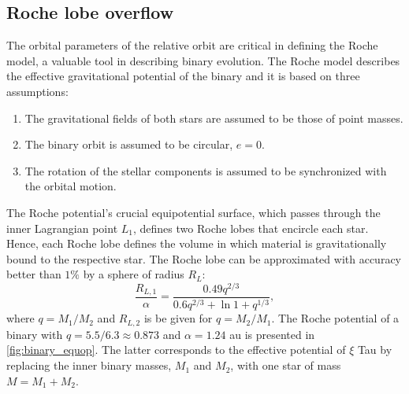 \subsection{Roche lobe overflow}\label{sub:roche_lobe}

The orbital parameters of the relative orbit are critical in defining the Roche model, a valuable tool in describing binary evolution. The Roche model describes the effective gravitational potential of the binary and it is based on three assumptions:
\begin{enumerate}
    \item The gravitational fields of both stars are assumed to be those of point masses.
    \item The binary orbit is assumed to be circular, $e=0$.
    \item The rotation of the stellar components is assumed to be synchronized with the orbital motion. 
\end{enumerate}
The Roche potential's crucial equipotential surface, which passes through the inner Lagrangian point $L_1$, defines two Roche lobes that encircle each star. Hence, each Roche lobe defines the volume in which material is gravitationally bound to the respective star. The Roche lobe can be approximated with accuracy better than $1\%$ by a sphere of radius $R_L$:
\begin{equation}\label{eq:roche_lobe}
    \frac{R_{L,1}}{\alpha} = \frac{0.49q^{2/3}}{0.6q^{2/3} + \ln{1+q^{1/3}}},
\end{equation}
where $q =M_1 / M_2$ and $R_{L,2}$ is be given for $q =M_2 / M_1$. The Roche potential of a binary with $q=5.5/6.3 \approx 0.873$ and $\alpha = 1.24$ au is presented in \cref{fig:binary_equop}. The latter corresponds to the effective potential of $\xi$ Tau by replacing the inner binary masses, $M_1$ and $M_2$, with one star of mass $M = M_1 + M_2$.
